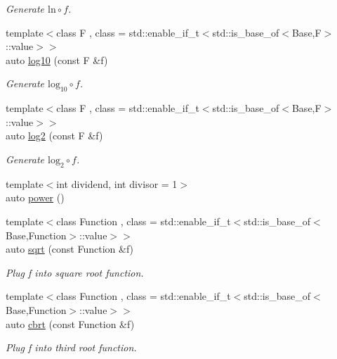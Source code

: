 \begin{DoxyCompactItemize}
\begin{DoxyCompactList}\small\item\em Generate $ \mathrm{ln}\circ f $. \end{DoxyCompactList}\item 
{\footnotesize template$<$class F , class  = std\-::enable\-\_\-if\-\_\-t$<$std\-::is\-\_\-base\-\_\-of$<$\-Base,\-F$>$\-::value$>$$>$ }\\auto \hyperlink{namespaceFunG_a9cbc33c0f72e85ab95dea43a5f433a57}{log10} (const F \&f)
\begin{DoxyCompactList}\small\item\em Generate $ \mathrm{log}_{10}\circ f $. \end{DoxyCompactList}\item 
{\footnotesize template$<$class F , class  = std\-::enable\-\_\-if\-\_\-t$<$std\-::is\-\_\-base\-\_\-of$<$\-Base,\-F$>$\-::value$>$$>$ }\\auto \hyperlink{namespaceFunG_a6cd9186e81287dbb4840524ca23ddab1}{log2} (const F \&f)
\begin{DoxyCompactList}\small\item\em Generate $ \mathrm{log}_{2}\circ f $. \end{DoxyCompactList}\item 
{\footnotesize template$<$int dividend, int divisor = 1$>$ }\\auto \hyperlink{group__CMathGroup_ga2e83be0dc26bc65453de63fa9e9b55cd}{power} ()
\item 
{\footnotesize template$<$class Function , class  = std\-::enable\-\_\-if\-\_\-t$<$std\-::is\-\_\-base\-\_\-of$<$\-Base,\-Function$>$\-::value$>$$>$ }\\auto \hyperlink{namespaceFunG_a136c890475e48f88469a737d95368d05}{sqrt} (const Function \&f)
\begin{DoxyCompactList}\small\item\em Plug f into square root function. \end{DoxyCompactList}\item 
{\footnotesize template$<$class Function , class  = std\-::enable\-\_\-if\-\_\-t$<$std\-::is\-\_\-base\-\_\-of$<$\-Base,\-Function$>$\-::value$>$$>$ }\\auto \hyperlink{namespaceFunG_aa7f2552adfb8ec41aeb685adddd8bf98}{cbrt} (const Function \&f)
\begin{DoxyCompactList}\small\item\em Plug f into third root function. \end{DoxyCompactList}\item 

\end{DoxyCompactItemize}
